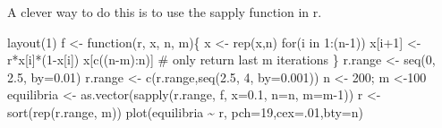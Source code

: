 \documentclass[
  letterpaper,
]{scrbook}
\newenvironment{Shaded}{\begin{snugshade}}{\end{snugshade}}
\newcommand{\AttributeTok}[1]{\textcolor[rgb]{0.40,0.45,0.13}{#1}}
\newcommand{\CommentTok}[1]{\textcolor[rgb]{0.37,0.37,0.37}{#1}}
\newcommand{\ControlFlowTok}[1]{\textcolor[rgb]{0.00,0.23,0.31}{#1}}
\newcommand{\DecValTok}[1]{\textcolor[rgb]{0.68,0.00,0.00}{#1}}
\newcommand{\FloatTok}[1]{\textcolor[rgb]{0.68,0.00,0.00}{#1}}
\newcommand{\FunctionTok}[1]{\textcolor[rgb]{0.28,0.35,0.67}{#1}}
\newcommand{\NormalTok}[1]{\textcolor[rgb]{0.00,0.23,0.31}{#1}}
\newcommand{\OtherTok}[1]{\textcolor[rgb]{0.00,0.23,0.31}{#1}}
\newcommand{\SpecialCharTok}[1]{\textcolor[rgb]{0.37,0.37,0.37}{#1}}
\newcommand{\StringTok}[1]{\textcolor[rgb]{0.13,0.47,0.30}{#1}}
\begin{document}
A clever way to do this is to use the sapply function in r.

\begin{Shaded}
\begin{Highlighting}[]
\FunctionTok{layout}\NormalTok{(}\DecValTok{1}\NormalTok{)}
\NormalTok{f }\OtherTok{\textless{}{-}} \ControlFlowTok{function}\NormalTok{(r, x, n, m)\{}
\NormalTok{  x }\OtherTok{\textless{}{-}} \FunctionTok{rep}\NormalTok{(x,n)}
  \ControlFlowTok{for}\NormalTok{(i }\ControlFlowTok{in} \DecValTok{1}\SpecialCharTok{:}\NormalTok{(n}\DecValTok{{-}1}\NormalTok{)) x[i}\SpecialCharTok{+}\DecValTok{1}\NormalTok{] }\OtherTok{\textless{}{-}}\NormalTok{ r}\SpecialCharTok{*}\NormalTok{x[i]}\SpecialCharTok{*}\NormalTok{(}\DecValTok{1}\SpecialCharTok{{-}}\NormalTok{x[i])}
\NormalTok{  x[}\FunctionTok{c}\NormalTok{((n}\SpecialCharTok{{-}}\NormalTok{m)}\SpecialCharTok{:}\NormalTok{n)] }\CommentTok{\# only return last m iterations}
\NormalTok{\}}
\NormalTok{r.range }\OtherTok{\textless{}{-}} \FunctionTok{seq}\NormalTok{(}\DecValTok{0}\NormalTok{, }\FloatTok{2.5}\NormalTok{, }\AttributeTok{by=}\FloatTok{0.01}\NormalTok{) }
\NormalTok{r.range }\OtherTok{\textless{}{-}} \FunctionTok{c}\NormalTok{(r.range,}\FunctionTok{seq}\NormalTok{(}\FloatTok{2.5}\NormalTok{, }\DecValTok{4}\NormalTok{, }\AttributeTok{by=}\FloatTok{0.001}\NormalTok{)) }
\NormalTok{n }\OtherTok{\textless{}{-}} \DecValTok{200}\NormalTok{; m }\OtherTok{\textless{}{-}}\DecValTok{100} 
\NormalTok{equilibria }\OtherTok{\textless{}{-}} \FunctionTok{as.vector}\NormalTok{(}\FunctionTok{sapply}\NormalTok{(r.range, f,  }\AttributeTok{x=}\FloatTok{0.1}\NormalTok{, }\AttributeTok{n=}\NormalTok{n, }\AttributeTok{m=}\NormalTok{m}\DecValTok{{-}1}\NormalTok{))}
\NormalTok{r }\OtherTok{\textless{}{-}} \FunctionTok{sort}\NormalTok{(}\FunctionTok{rep}\NormalTok{(r.range, m))}
\FunctionTok{plot}\NormalTok{(equilibria }\SpecialCharTok{\textasciitilde{}}\NormalTok{ r, }\AttributeTok{pch=}\DecValTok{19}\NormalTok{,}\AttributeTok{cex=}\NormalTok{.}\DecValTok{01}\NormalTok{,}\AttributeTok{bty=}\StringTok{\textquotesingle{}n\textquotesingle{}}\NormalTok{)}
\end{Highlighting}
\end{Shaded}
\end{document}
